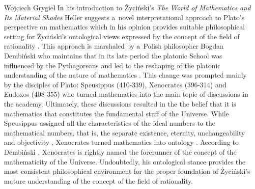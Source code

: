 \begin{artengenv}{Wojciech Grygiel}
In his introduction to Życiński's \textit{The World of Mathematics and Its Material Shades} Heller suggests a~novel interpretational approach to Plato's perspective on mathematics which in his opinion provides suitable philosophical setting for Życiński's ontological views expressed by the concept of the field of rationality
\parencite[][pp.5–15]{zycinski_swiat_2013}. %
 This approach is marshaled by a~Polish philosopher Bogdan Dembiński who maintains that in its late period the platonic School was influenced by the Pythagoreans and led to the reshaping of the platonic understanding of the nature of mathematics 
\parencites[][]{dembinski_pozna_2003}[][]{dembinski_pozny_2010}[][]{dembinski_o_2015}[][]{dembinski_u_2017}[][]{dembinski_theory_2019}. %
 This change was prompted mainly by the disciples of Plato: Speusippus (410-339), Xenocrates (396-314) and Eudoxos (408-355) who turned mathematics into the main topic of discussions in the academy. Ultimately, these discussions resulted in the the belief that it is mathematics that constitutes the fundamental stuff of the Universe. While Speusippus assigned all the characteristics of the ideal numbers to the mathematical numbers, that is, the separate existence, eternity, unchangeability and objectivity 
\parencite[][pp.109–138]{dembinski_pozny_2010}, %
 Xenocrates turned mathematics into ontology 
\parencite[][pp.139–170]{dembinski_pozny_2010}. %
 According to Dembiński 
\parencite*[][p.158]{dembinski_pozny_2010}, %
 Xenocrates is rightly named the forerunner of the concept of the mathematicity of the Universe. Undoubtedly, his ontological stance provides the most consistent philosophical environment for the proper foundation of Życiński's mature understanding of the concept of the field of rationality.


\end{artengenv}
